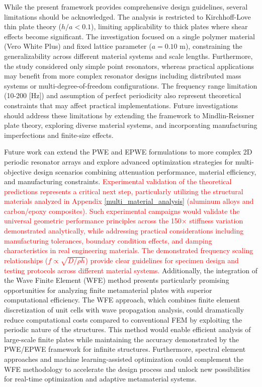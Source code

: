 \documentclass[review,numbers,sort&compress]{elsarticle}
\begin{document}
While the present framework provides comprehensive design guidelines, several limitations should be acknowledged. The analysis is restricted to Kirchhoff-Love thin plate theory ($h/a < 0.1$), limiting applicability to thick plates where shear effects become significant. The investigation focused on a single polymer material (Vero White Plus) and fixed lattice parameter ($a = 0.10$ m), constraining the generalizability across different material systems and scale lengths. Furthermore, the study considered only simple point resonators, whereas practical applications may benefit from more complex resonator designs including distributed mass systems or multi-degree-of-freedom configurations. The frequency range limitation (10-200 [Hz]) and assumption of perfect periodicity also represent theoretical constraints that may affect practical implementations. Future investigations should address these limitations by extending the framework to Mindlin-Reissner plate theory, exploring diverse material systems, and incorporating manufacturing imperfections and finite-size effects.

Future work can extend the PWE and EPWE formulations to more complex 2D periodic resonator arrays and explore advanced optimization strategies for multi-objective design scenarios combining attenuation performance, material efficiency, and manufacturing constraints. \textcolor{red}{Experimental validation of the theoretical predictions represents a critical next step, particularly utilizing the structural materials analyzed in Appendix \ref{multi_material_analysis} (aluminum alloys and carbon/epoxy composites). Such experimental campaigns would validate the universal geometric performance principles across the 150× stiffness variation demonstrated analytically, while addressing practical considerations including manufacturing tolerances, boundary condition effects, and damping characteristics in real engineering materials. The demonstrated frequency scaling relationships ($f \propto \sqrt{D/\rho h}$) provide clear guidelines for specimen design and testing protocols across different material systems.} Additionally, the integration of the Wave Finite Element (WFE) method presents particularly promising opportunities for analyzing finite metamaterial plates with superior computational efficiency. The WFE approach, which combines finite element discretization of unit cells with wave propagation analysis, could dramatically reduce computational costs compared to conventional FEM by exploiting the periodic nature of the structures. This method would enable efficient analysis of large-scale finite plates while maintaining the accuracy demonstrated by the PWE/EPWE framework for infinite structures. Furthermore, spectral element approaches and machine learning-assisted optimization could complement the WFE methodology to accelerate the design process and unlock new possibilities for real-time optimization and adaptive metamaterial systems.
\end{document}
